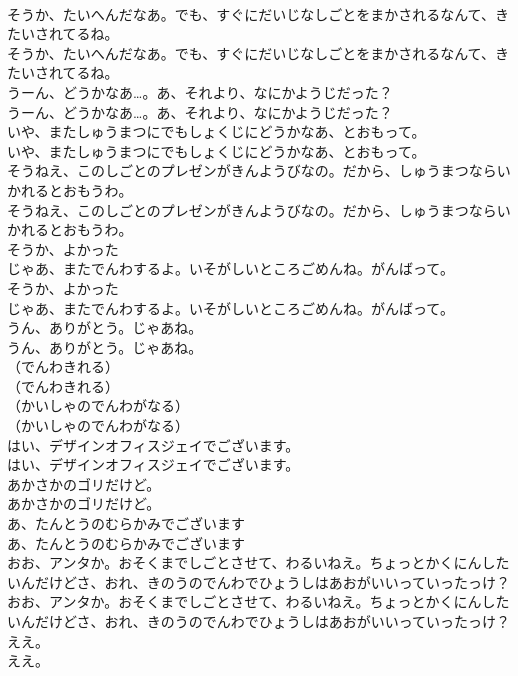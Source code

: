 \documentclass[8pt]{extreport}
\begin{document}
\begin{CJK}{UTF8}{min}
\\	そうか、たいへんだなあ。でも、すぐにだいじなしごとをまかされるなんて、きたいされてるね。
\\	そうか、たいへんだなあ。でも、すぐにだいじなしごとをまかされるなんて、きたいされてるね。
\\	うーん、どうかなあ…。あ、それより、なにかようじだった？
\\	うーん、どうかなあ…。あ、それより、なにかようじだった？
\\	いや、またしゅうまつにでもしょくじにどうかなあ、とおもって。
\\	いや、またしゅうまつにでもしょくじにどうかなあ、とおもって。
\\	そうねえ、このしごとのプレゼンがきんようびなの。だから、しゅうまつならいかれるとおもうわ。
\\	そうねえ、このしごとのプレゼンがきんようびなの。だから、しゅうまつならいかれるとおもうわ。
\\	そうか、よかった
\\	じゃあ、またでんわするよ。いそがしいところごめんね。がんばって。
\\	そうか、よかった
\\	じゃあ、またでんわするよ。いそがしいところごめんね。がんばって。
\\	うん、ありがとう。じゃあね。
\\	うん、ありがとう。じゃあね。
\\	（でんわきれる）
\\	（でんわきれる）
\\	（かいしゃのでんわがなる）
\\	（かいしゃのでんわがなる）
\\	はい、デザインオフィスジェイでございます。
\\	はい、デザインオフィスジェイでございます。
\\	あかさかのゴリだけど。
\\	あかさかのゴリだけど。
\\	あ、たんとうのむらかみでございます
\\	あ、たんとうのむらかみでございます
\\	おお、アンタか。おそくまでしごとさせて、わるいねえ。ちょっとかくにんしたいんだけどさ、おれ、きのうのでんわでひょうしはあおがいいっていったっけ？
\\	おお、アンタか。おそくまでしごとさせて、わるいねえ。ちょっとかくにんしたいんだけどさ、おれ、きのうのでんわでひょうしはあおがいいっていったっけ？
\\	ええ。
\\	ええ。

\end{CJK}
\end{document}
